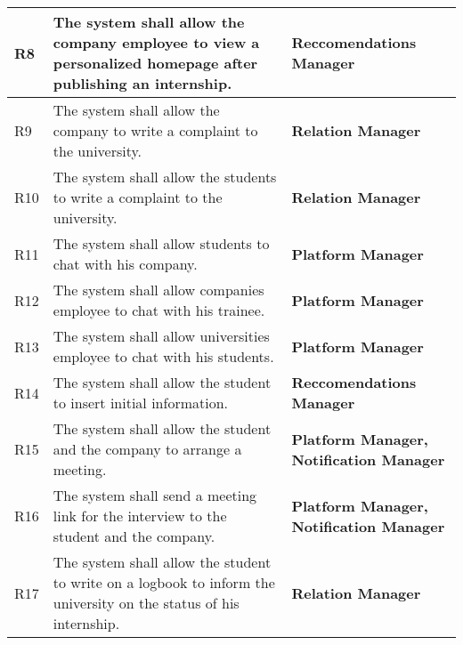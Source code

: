 \begin{center}
\begin{longtable}{|l|p{8cm}|p{5cm}|}
        R8    &  The system shall allow the company employee to view a personalized homepage after publishing an internship.                                                                                               & \textbf{Reccomendations Manager}                                                       \\\hline
        R9    & The system shall allow the company to write a complaint to the university.                                                                                              & \textbf{Relation Manager}
            \\\hline
        R10   & The system shall allow the students to write a complaint to the university.                                                       & \textbf{Relation Manager}                                                  \\\hline
        R11   & The system shall allow students to chat with his company.                            & \textbf{Platform Manager}                                                  \\\hline
        R12   & The system shall allow companies employee to chat with his trainee.                                                                 & \textbf{Platform Manager}                                                  \\\hline
        R13   & The system shall allow universities employee to chat with his students. & \textbf{Platform Manager}                                                  \\\hline
        R14   & The system shall allow the student to insert initial information.                                                                                                             & \textbf{Reccomendations Manager}                                                  \\\hline
        R15   & The system shall allow the student and the company to arrange a meeting.                                                                            & \textbf{Platform Manager, Notification Manager}                            \\\hline
        R16   & The system shall send a meeting link for the interview to the student and the company.               & \textbf{Platform Manager, Notification Manager}                                                  \\\hline
        R17   & The system shall allow the student to write on a logbook to inform the university on the status of his internship.                                                                                                                      & \textbf{Relation Manager}                                                                       \\\hline
    \end{longtable}
\end{center}
